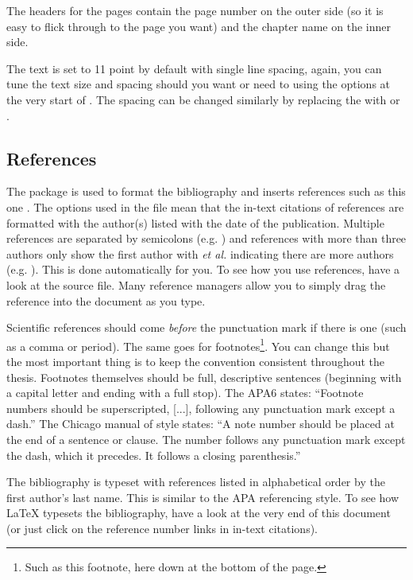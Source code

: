 The headers for the pages contain the page number on the outer side (so it is easy to flick through to the page you want) and the chapter name on the inner side.

The text is set to 11 point by default with single line spacing, again, you can tune the text size and spacing should you want or need to using the options at the very start of . The spacing can be changed similarly by replacing the  with  or .


\subsection{References}

The  package is used to format the bibliography and inserts references such as this one \parencite{Reference1}. The options used in the  file mean that the in-text citations of references are formatted with the author(s) listed with the date of the publication. Multiple references are separated by semicolons (e.g. \parencite{Reference2, Reference1}) and references with more than three authors only show the first author with \emph{et al.} indicating there are more authors (e.g. \parencite{Reference3}). This is done automatically for you. To see how you use references, have a look at the  source file. Many reference managers allow you to simply drag the reference into the document as you type.

Scientific references should come \emph{before} the punctuation mark if there is one (such as a comma or period). The same goes for footnotes\footnote{Such as this footnote, here down at the bottom of the page.}. You can change this but the most important thing is to keep the convention consistent throughout the thesis. Footnotes themselves should be full, descriptive sentences (beginning with a capital letter and ending with a full stop). The APA6 states: \enquote{Footnote numbers should be superscripted, [...], following any punctuation mark except a dash.} The Chicago manual of style states: \enquote{A note number should be placed at the end of a sentence or clause. The number follows any punctuation mark except the dash, which it precedes. It follows a closing parenthesis.}

The bibliography is typeset with references listed in alphabetical order by the first author's last name. This is similar to the APA referencing style. To see how \LaTeX{} typesets the bibliography, have a look at the very end of this document (or just click on the reference number links in in-text citations).


